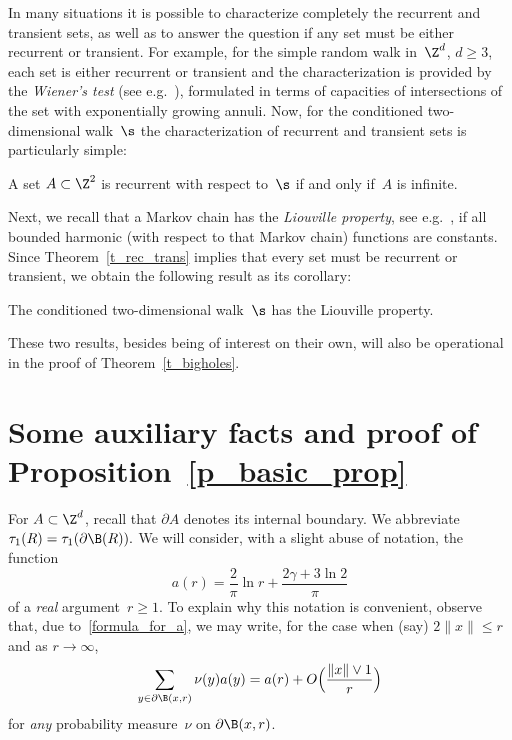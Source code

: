 In many situations it is possible to characterize completely the recurrent and transient sets, as well as to answer the question if any set must be either recurrent or transient. For example, for the simple random walk in~$\Z^d$, $d\geq 3$, each set is either recurrent or transient and the characterization is provided by the \emph{Wiener's test} (see e.g.~\cite[Corollary~6.5.9]{LL10}), formulated in terms of capacities of intersections of the set with exponentially growing annuli. Now, for the conditioned two-dimensional walk~$\s$ the characterization of recurrent and transient sets is particularly simple:

\begin{theo}\label{t_rec_trans}
A set $A\subset\Z^2$ is recurrent with respect to~$\s$ if and only if~$A$ is infinite.
\end{theo}

Next, we recall that a Markov chain has the \emph{Liouville property}, see e.g.~\cite[Chapter~IV]{Woess09}, if all bounded harmonic (with respect to that Markov chain) functions are constants. Since Theorem~\ref{t_rec_trans} implies that every set must be recurrent or transient, we obtain the following result as its corollary:

\begin{theo}\label{t_Liouville}
The conditioned two-dimensional walk~$\s$ has the Liouville property.
\end{theo}

These two results, besides being of interest on their own, will also be operational in the proof of Theorem~\ref{t_bigholes}.



\section{Some auxiliary facts and proof of Proposition~\ref{p_basic_prop}}\label{s_aux}

For $A\subset \Z^d$, recall that $\partial A$ denotes its internal boundary. We abbreviate $\tau_1(R) = \tau_1(\partial \B(R)).$ We will consider, with a slight abuse of notation, the function
\[
a(r)=\frac{2}{\pi}\ln r + \frac{2\gamma+ 3\ln 2}{\pi}
\]
of a \emph{real} argument~$r\geq 1$. To explain why this notation is convenient, observe that, due to~\eqref{formula_for_a}, we may write, for the case when (say) $2\|x\|\leq r$ and as $r\to\infty$,
\begin{equation}\label{real_a}
\sum_{y\in\partial \B(x,r)} \nu(y)a(y) = a(r) + O\Big(\frac{\|x\|\vee 1}{r}\Big)
\end{equation}
for \emph{any} probability measure~$\nu$ on $\partial \B(x,r)$.

